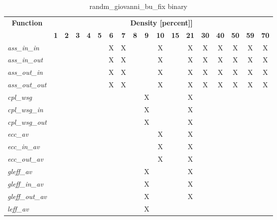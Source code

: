 \begin{table}[h] \centering \begin{tabular}{|l|c|c|c|c|c|c|c|c|c|c|c|c|c|c|c|c|c|} \hline\multicolumn{1}{|c|}{\textbf{\large{Function}}} & \multicolumn{17}{c|}{\large{\textbf{Density [percent]]}}}\\\cline{2-18}  & \textbf{1} &  \textbf{2} &  \textbf{3} &  \textbf{4} &  \textbf{5} &  \textbf{6} &  \textbf{7} &  \textbf{8} &  \textbf{9} &  \textbf{10} &  \textbf{15} &  \textbf{21} &  \textbf{30} &  \textbf{40} &  \textbf{50} &  \textbf{59} &  \textbf{70} \\ \hline   \textit{ass\_in\_in} &   &   &   &   &   & X & X &   &   & X &   & X & X & X & X & X & X \\ \hline  \textit{ass\_in\_out} &   &   &   &   &   & X & X &   &   & X &   & X & X & X & X & X & X \\ \hline  \textit{ass\_out\_in} &   &   &   &   &   & X & X &   &   & X &   & X & X & X & X & X & X \\ \hline  \textit{ass\_out\_out} &   &   &   &   &   & X & X &   &   & X &   & X & X & X & X & X & X \\ \hline  \textit{cpl\_wsg} &   &   &   &   &   &   &   &   & X &   &   & X &   &   &   &   &   \\ \hline  \textit{cpl\_wsg\_in} &   &   &   &   &   &   &   &   & X &   &   & X &   &   &   &   &   \\ \hline  \textit{cpl\_wsg\_out} &   &   &   &   &   &   &   &   & X &   &   & X &   &   &   &   &   \\ \hline  \textit{ecc\_av} &   &   &   &   &   &   &   &   &   & X &   & X &   &   &   &   &   \\ \hline  \textit{ecc\_in\_av} &   &   &   &   &   &   &   &   &   & X &   & X &   &   &   &   &   \\ \hline  \textit{ecc\_out\_av} &   &   &   &   &   &   &   &   &   & X &   & X &   &   &   &   &   \\ \hline  \textit{gleff\_av} &   &   &   &   &   &   &   &   & X &   &   & X &   &   &   &   &   \\ \hline  \textit{gleff\_in\_av} &   &   &   &   &   &   &   &   & X &   &   & X &   &   &   &   &   \\ \hline  \textit{gleff\_out\_av} &   &   &   &   &   &   &   &   & X &   &   & X &   &   &   &   &   \\ \hline  \textit{leff\_av} &   &   &   &   &   &   &   &   & X &   &   &   &   &   &   &   &   \\ \hline \end{tabular}\caption{randm\_giovanni\_bu\_fix binary}\label{tab:my_label} \end{table}